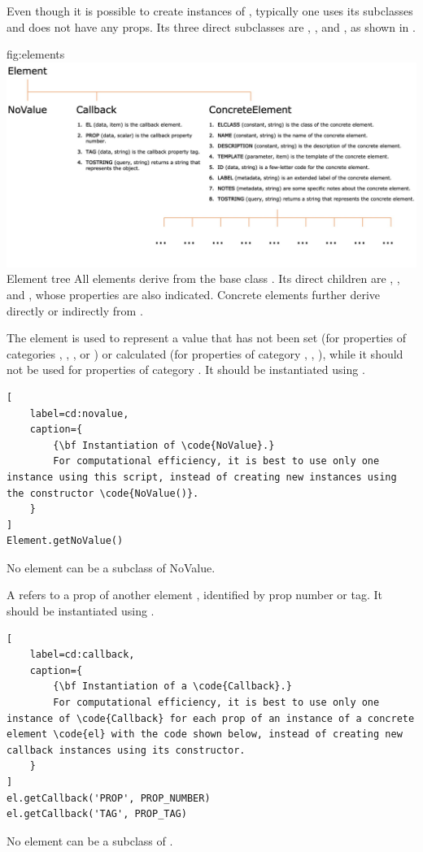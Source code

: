 \documentclass{tufte-handout}
\begin{document}
Even though it is possible to create instances of , typically one uses its subclasses and does not have any props.
Its three direct subclasses are , , and , as shown in .

	{fig:elements}
	{\includegraphics{fig01.jpg}}
	{Element tree}
	{
	All elements derive from the base class . 
	Its direct children are , , and , whose properties are also indicated.
	Concrete elements further derive directly or indirectly from .
	}

The element  is used to represent a value that has not been set (for properties of categories , , ,  or ) or calculated (for properties of category , , ), while it should not be used for properties of category .
It should be instantiated using .
%
\begin{lstlisting}[
	label=cd:novalue,
	caption={
		{\bf Instantiation of \code{NoValue}.}
		For computational efficiency, it is best to use only one instance using this script, instead of creating new instances using the constructor \code{NoValue()}. 
	}
]
Element.getNoValue()
\end{lstlisting}
%
No element can be a subclass of NoValue.
  
A  refers to a prop of another element , identified by prop number or tag.
It should be instantiated using .
%
\begin{lstlisting}[
	label=cd:callback,
	caption={
		{\bf Instantiation of a \code{Callback}.}
		For computational efficiency, it is best to use only one instance of \code{Callback} for each prop of an instance of a concrete element \code{el} with the code shown below, instead of creating new callback instances using its constructor. 
	}
]
el.getCallback('PROP', PROP_NUMBER)
el.getCallback('TAG', PROP_TAG)
\end{lstlisting}
%
No element can be a subclass of .
\end{document}
